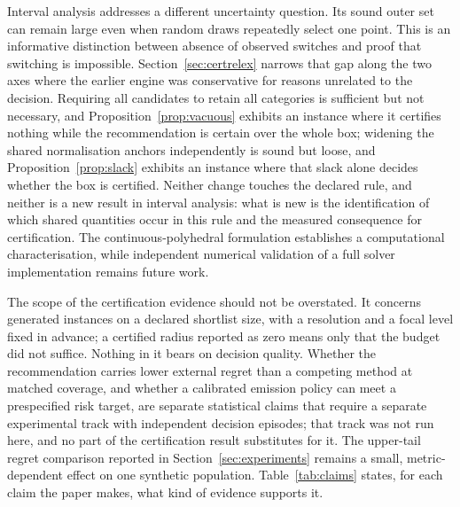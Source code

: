 Interval analysis addresses a different uncertainty question. Its sound outer set can remain large even when random draws repeatedly select one point. This is an informative distinction between absence of observed switches and proof that switching is impossible. Section~\ref{sec:certrelex} narrows that gap along the two axes where the earlier engine was conservative for reasons unrelated to the decision. Requiring all candidates to retain all categories is sufficient but not necessary, and Proposition~\ref{prop:vacuous} exhibits an instance where it certifies nothing while the recommendation is certain over the whole box; widening the shared normalisation anchors independently is sound but loose, and Proposition~\ref{prop:slack} exhibits an instance where that slack alone decides whether the box is certified. Neither change touches the declared rule, and neither is a new result in interval analysis: what is new is the identification of which shared quantities occur in this rule and the measured consequence for certification. The continuous-polyhedral formulation establishes a computational characterisation, while independent numerical validation of a full solver implementation remains future work.

The scope of the certification evidence should not be overstated. It concerns generated instances on a declared shortlist size, with a resolution and a focal level fixed in advance; a certified radius reported as zero means only that the budget did not suffice. Nothing in it bears on decision quality. Whether the recommendation carries lower external regret than a competing method at matched coverage, and whether a calibrated emission policy can meet a prespecified risk target, are separate statistical claims that require a separate experimental track with independent decision episodes; that track was not run here, and no part of the certification result substitutes for it. The upper-tail regret comparison reported in Section~\ref{sec:experiments} remains a small, metric-dependent effect on one synthetic population. Table~\ref{tab:claims} states, for each claim the paper makes, what kind of evidence supports it.

